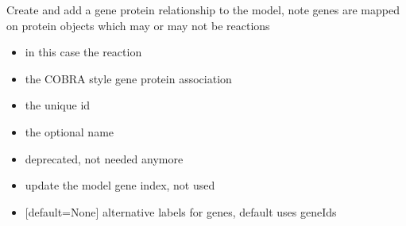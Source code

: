 \documentclass[letterpaper,10pt,english]{sphinxmanual}
\begin{document}
\begin{fulllineitems}
\begin{fulllineitems}
\label{\detokenize{modules_doc:cbmpy.CBModel.Model.createGeneProteinAssociation}}
\pysigstartsignatures
{}
\pysigstopsignatures
\sphinxAtStartPar
Create and add a gene protein relationship to the model, note genes are mapped on protein objects which may or may not be reactions
\begin{itemize}
\item {} 
\sphinxAtStartPar
{} in this case the reaction

\item {} 
\sphinxAtStartPar
{} the COBRA style gene protein association

\item {} 
\sphinxAtStartPar
{} the unique id

\item {} 
\sphinxAtStartPar
{} the optional name

\item {} 
\sphinxAtStartPar
{} deprecated, not needed anymore

\item {} 
\sphinxAtStartPar
{} update the model gene index, not used

\item {} 
\sphinxAtStartPar
{} {[}default=None{]} alternative labels for genes, default uses geneIds

\end{itemize}

\end{fulllineitems}



\end{fulllineitems}
\end{document}
